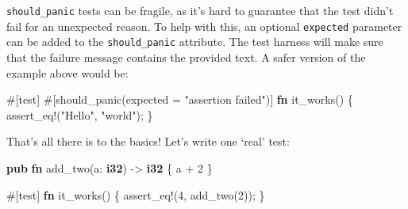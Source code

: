 \documentclass[a4paper,]{book}
\newenvironment{Shaded}{\begin{snugshade}}{\end{snugshade}}
\newcommand{\KeywordTok}[1]{\textcolor[rgb]{0.13,0.29,0.53}{\textbf{{#1}}}}
\newcommand{\DecValTok}[1]{\textcolor[rgb]{0.00,0.00,0.81}{{#1}}}
\newcommand{\StringTok}[1]{\textcolor[rgb]{0.31,0.60,0.02}{{#1}}}
\newcommand{\OtherTok}[1]{\textcolor[rgb]{0.56,0.35,0.01}{{#1}}}
\newcommand{\NormalTok}[1]{{#1}}
\begin{document}
\begin{Shaded}
\end{Shaded}

\texttt{should\_panic} tests can be fragile, as it's hard to guarantee
that the test didn't fail for an unexpected reason. To help with this,
an optional \texttt{expected} parameter can be added to the
\texttt{should\_panic} attribute. The test harness will make sure that
the failure message contains the provided text. A safer version of the
example above would be:

\begin{Shaded}
\begin{Highlighting}[]
\OtherTok{#[}\NormalTok{test}\OtherTok{]}
\OtherTok{#[}\NormalTok{should_panic}\OtherTok{(}\NormalTok{expected }\OtherTok{=} \StringTok{"assertion failed"}\OtherTok{)]}
\KeywordTok{fn} \NormalTok{it_works() \{}
    \OtherTok{assert_eq!}\NormalTok{(}\StringTok{"Hello"}\NormalTok{, }\StringTok{"world"}\NormalTok{);}
\NormalTok{\}}
\end{Highlighting}
\end{Shaded}

That's all there is to the basics! Let's write one `real' test:

\begin{Shaded}
\begin{Highlighting}[]
\KeywordTok{pub} \KeywordTok{fn} \NormalTok{add_two(a: }\KeywordTok{i32}\NormalTok{) -> }\KeywordTok{i32} \NormalTok{\{}
    \NormalTok{a + }\DecValTok{2}
\NormalTok{\}}

\OtherTok{#[}\NormalTok{test}\OtherTok{]}
\KeywordTok{fn} \NormalTok{it_works() \{}
    \OtherTok{assert_eq!}\NormalTok{(}\DecValTok{4}\NormalTok{, add_two(}\DecValTok{2}\NormalTok{));}
\NormalTok{\}}
\end{Highlighting}
\end{Shaded}
\end{document}

